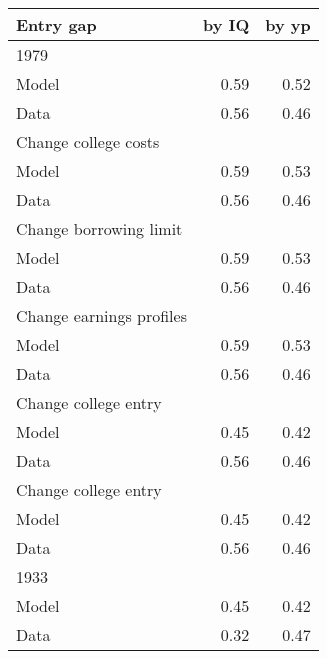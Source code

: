 \begin{tabular}{lrr}
\hline
Entry gap & by IQ  & by yp  \\ 
\hline
1979 &   &   \\ 
Model & 0.59  & 0.52  \\ 
Data & 0.56  & 0.46  \\ 
Change college costs &   &   \\ 
Model & 0.59  & 0.53  \\ 
Data & 0.56  & 0.46  \\ 
Change borrowing limit &   &   \\ 
Model & 0.59  & 0.53  \\ 
Data & 0.56  & 0.46  \\ 
Change earnings profiles &   &   \\ 
Model & 0.59  & 0.53  \\ 
Data & 0.56  & 0.46  \\ 
Change college entry &   &   \\ 
Model & 0.45  & 0.42  \\ 
Data & 0.56  & 0.46  \\ 
Change college entry &   &   \\ 
Model & 0.45  & 0.42  \\ 
Data & 0.56  & 0.46  \\ 
1933 &   &   \\ 
Model & 0.45  & 0.42  \\ 
Data & 0.32  & 0.47  \\ 
\hline
\end{tabular}%
